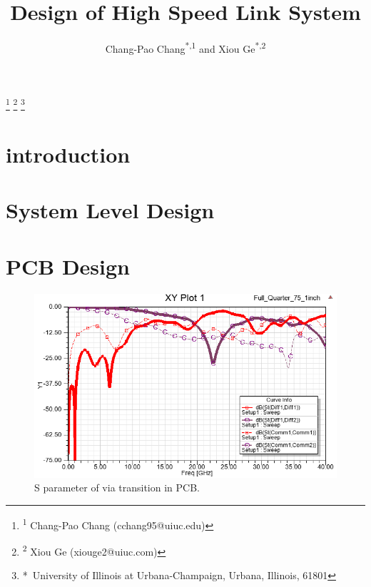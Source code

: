 \documentclass{pj}
\begin{document}
\setcounter{page}{1}
\pjheader{}

\title{Design of High Speed Link System}

\newcommand{\defaultfigurewidth}{0.5\columnwidth}

\footnote{\hskip-0.12in\textsuperscript{1} Chang-Pao Chang (cchang95@uiuc.edu)}
\footnote{\hskip-0.12in\textsuperscript{2} Xiou Ge (xiouge2@uiuc.com)}
\footnote{\hskip-0.12in*\ University of Illinois at Urbana-Champaign, Urbana, Illinois, 61801}

\author{Chang-Pao Chang\textsuperscript{*,1} and Xiou Ge\textsuperscript{*,2}}



\begin{abstract}
	
\end{abstract}
%
\section{introduction}
\label{sec:Intro}

\section{System Level Design}
\label{sec:system}

\section{PCB Design}
\label{sec:pcb_design}





\begin{figure}[htbp!]
	\centering
	\includegraphics[width=0.8\columnwidth]{./img/PCB/Via_Transition/S_parameter.png}
	\caption{S parameter of via transition in PCB.}
	\label{fig:pcb_via_tran_S} %
\end{figure}
\end{document}
